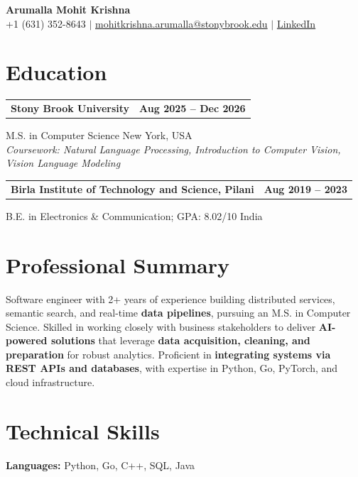 \documentclass[letterpaper,10pt]{article}
\makeatletter
\newcommand{\entry}[2]{%
  \noindent
  \begin{tabularx}{\linewidth}
    {@{}>{\raggedright\arraybackslash}X@{\hspace{6pt}}r@{}}
    \textbf{#1} & #2
  \end{tabularx}\par
}
\makeatother
\begin{document}
\begin{center}
    {\LARGE\bfseries Arumalla Mohit Krishna}\\[3pt]
    +1 (631) 352-8643 $|$
    \href{mailto:mohitkrishna.arumalla@stonybrook.edu}
    {mohitkrishna.arumalla@stonybrook.edu} $|$
    \href{https://linkedin.com/in/mohit-krishna-arumalla}
    {LinkedIn}
\end{center}
\vspace{-8pt}

\section{Education}

\entry
  {\textbf{Stony Brook University}}
  {\textbf{Aug 2025 -- Dec 2026}}

M.S. in Computer Science \hfill New York, USA\\
\textit{
Coursework: Natural Language Processing,
Introduction to Computer Vision, Vision Language Modeling
}
\vspace{3pt}

\entry
  {\textbf{Birla Institute of Technology and Science, Pilani}}
  {\textbf{Aug 2019 -- 2023}}

B.E. in Electronics \& Communication; GPA: 8.02/10 \hfill India
\section{Professional Summary}

Software engineer with 2+ years of experience building distributed services, semantic search, and real-time \textbf{data pipelines}, pursuing an M.S. in Computer Science. Skilled in working closely with business stakeholders to deliver \textbf{AI-powered solutions} that leverage \textbf{data acquisition, cleaning, and preparation} for robust analytics. Proficient in \textbf{integrating systems via REST APIs and databases}, with expertise in Python, Go, PyTorch, and cloud infrastructure.

\section{Technical Skills}

\textbf{Languages:}
Python, Go, C++, SQL, Java\\
\end{document}
